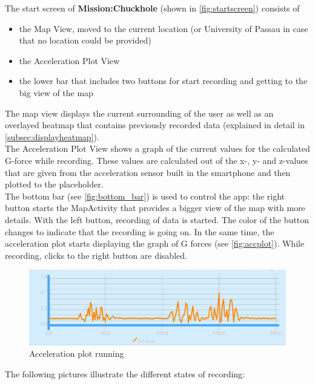 \documentclass[10pt,a4paper]{article} %
\begin{document}
	The start screen of \textbf{Mission:Chuckhole} (shown in \autoref{fig:startscreen}) consists of 			
		\begin{itemize}
			\item the Map View, moved to the current location (or University of Passau in case that no location could be provided)
			\item the Acceleration Plot View
			\item the lower bar that includes two buttons for start recording and getting to the big view of the map
		\end{itemize}

	The map view displays the current surrounding of the user as well as an overlayed heatmap that contains previously recorded data (explained in detail in \autoref{subsec:displayheatmap}).\\
	The Acceleration Plot View shows a graph of the current values for the calculated G-force while recording. 
	These values are calculated out of the x-, y- and z-values that are given from the acceleration sensor built in the smartphone and then plotted to the placeholder.\\
	The bottom bar (see \autoref{fig:bottom_bar}) is used to control the app: the right button starts the MapActivity that provides a bigger view of the map with more details.
	With the left button, recording of data is started. 
	The color of the button changes to indicate that the recording is going on.
	In the same time, the acceleration plot starts displaying the graph of G forces (see \autoref{fig:accplot}).
	While recording, clicks to the right button are disabled.\\
	
	\begin{figure}[H]
		\begin{center}
 		  \includegraphics[scale=0.4]{img/acc_plot.png}
		  \caption{Acceleration plot running}
		  \label{fig:accplot}
		\end{center}
	\end{figure}

The following pictures illustrate the different states of recording:
\end{document}
